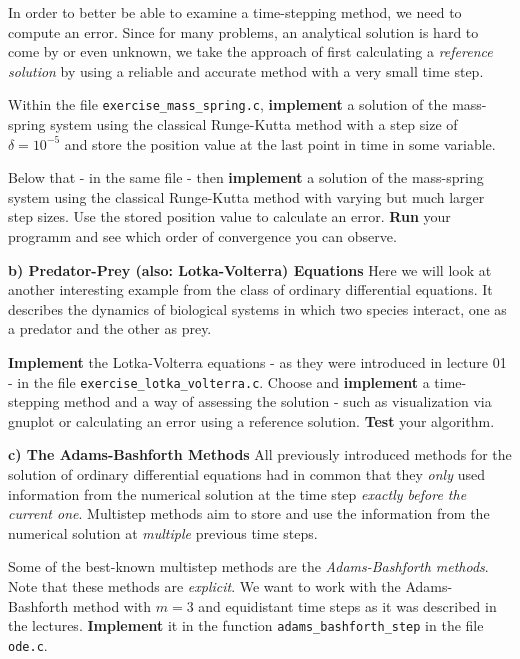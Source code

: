 \documentclass[a4paper]{scrartcl}
\begin{document}
In order to better be able to examine a time-stepping method, we need to compute an error. Since for many problems, an analytical solution is hard to come by or even unknown, we take the approach of first calculating a \emph{reference solution} by using a reliable and accurate method with a very small time step.

Within the file \texttt{exercise\_mass\_spring.c}, \textbf{implement} a solution of the mass-spring system using the classical Runge-Kutta method with a step size of $\delta=10^{-5}$ and store the position value at the last point in time in some variable. 

Below that - in the same file - then \textbf{implement} a solution of the mass-spring system using the classical Runge-Kutta method with varying but much larger step sizes. Use the stored position value to calculate an error. \textbf{Run} your programm and see which order of convergence you can observe.\newline

\textbf{b) Predator-Prey (also: Lotka-Volterra) Equations}\newline\newline
Here we will look at another interesting example from the class of ordinary differential equations. It describes the dynamics of biological systems in which two species interact, one as a predator and the other as prey.

\textbf{Implement} the Lotka-Volterra equations - as they were introduced in lecture 01 - in the file \texttt{exercise\_lotka\_volterra.c}. Choose and \textbf{implement} a time-stepping method and a way of assessing the solution - such as visualization via gnuplot or calculating an error using a reference solution. \textbf{Test} your algorithm.\newline

\textbf{c) The Adams-Bashforth Methods}\newline\newline
All previously introduced methods for the solution of ordinary differential equations had in common that they \emph{only} used information from the numerical solution at the time step \emph{exactly before the current one}. Multistep methods aim to store and use the information from the numerical solution at \emph{multiple} previous time steps.

Some of the best-known multistep methods are the \emph{Adams-Bashforth methods}. Note that these methods are \emph{explicit}. We want to work with the Adams-Bashforth method with $m=3$ and equidistant time steps as it was described in the lectures. \textbf{Implement} it in the function \texttt{adams\_bashforth\_step} in the file \texttt{ode.c}.
\end{document}
